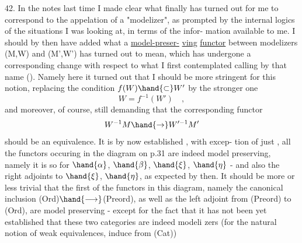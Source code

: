 42. In the notes last time I made clear what finally has turned out for
me to correspond to the appelation of a "modelizer", as prompted by the
internal logics of the situations I was looking at, in terms of the infor-%
mation available to me. I should by then have added what a \uline{model-preser-}%
\uline{ving}  \uline{functor} between modelizers (M,W) and (M',W') has turned out to mean,
which has undergone a corresponding change with respect  to what I first
contemplated calling by that name (). Namely here it turned out that
I should be more stringent for this notion, replacing the condition
$f(W) \hand{\subset} W'$ by the stronger one
\[ W = f^{-1}(W') \quad , \]
and moreover, of course, still demanding that the corresponding functor
\[ W^{-1}M \hand{\to} W'^{-1}M' \]
should be an equivalence. It is by now established , with   excep-%
tion of just  ,  all the functors occuring in the diagram on p.31 are
indeed model preserving, namely it is so for $\hand{\alpha}$, $\hand{\beta}$, $\hand{\xi}$, $\hand{\eta}$ - and also
the right adjoints to $\hand{\xi}$, $\hand{\eta}$, as expected by then. It should be more or 
less trivial that the first of the functors in this diagram, namely
the canonical inclusion (Ord)$\hand{\longrightarrow}$(Preord), as well as the left adjoint
from (Preord) to (Ord), are model preserving - except for the fact that it
has not been yet established that these two categories are indeed modeli
zers (for the natural notion of weak equivalences, induce from (Cat))\hand{,}
